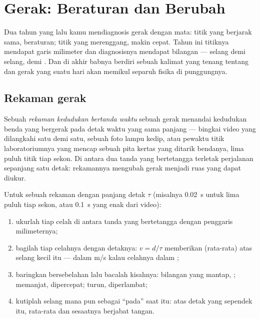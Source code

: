 \chapter{Gerak: Beraturan dan Berubah}\label{ch:g9:uniform-varied-motion}

Dua tahun yang lalu kamu mendiagnosis gerak dengan mata: titik yang
berjarak sama, beraturan; titik yang merenggang, makin cepat. Tahun
ini titiknya mendapat garis milimeter dan diagnosisnya mendapat
bilangan --- selang demi selang,  demi . Dan di akhir
babnya berdiri sebuah kalimat yang tenang tentang  dan gerak yang
suatu hari akan memikul separuh fisika di punggungnya.

\section{Rekaman gerak}

\begin{definition}\label{def:g9:uniform-varied-motion:record}
Sebuah \emph{rekaman kedudukan bertanda waktu} sebuah gerak menandai kedudukan benda yang bergerak
pada detak waktu yang sama panjang --- bingkai video yang dilangkahi
satu demi satu, sebuah foto lampu kedip, atau pewaktu titik
laboratoriumnya yang mencap sebuah pita kertas yang ditarik bendanya,
lima puluh titik tiap sekon. Di antara dua tanda yang bertetangga
terletak perjalanan sepanjang satu detak: rekamannya mengubah gerak
menjadi ruas yang dapat diukur.
\end{definition}

\begin{method}\label{met:g9:uniform-varied-motion:read}
Untuk sebuah rekaman dengan panjang detak $\tau$ (misalnya
\qty{0.02}{s} untuk lima puluh tiap sekon, atau \qty{0.1}{s} yang enak
dari video):
\begin{enumerate}
  \item ukurlah tiap celah di antara tanda yang bertetangga dengan
        penggaris milimeternya;
  \item bagilah tiap celahnya dengan detaknya: $v = d/\tau$ memberikan
         (rata-rata) atas selang kecil itu --- dalam
        \unit{m/s} kalau celahnya dalam ;
  \item baringkan  bersebelahan lalu bacalah kisahnya:
        bilangan yang mantap, ; memanjat, dipercepat;
        turun, diperlambat;
  \item kutiplah  selang mana pun sebagai  ``pada''
        saat itu: atas detak yang sependek itu, rata-rata dan
        sesaatnya berjabat tangan.
\end{enumerate}
\end{method}

